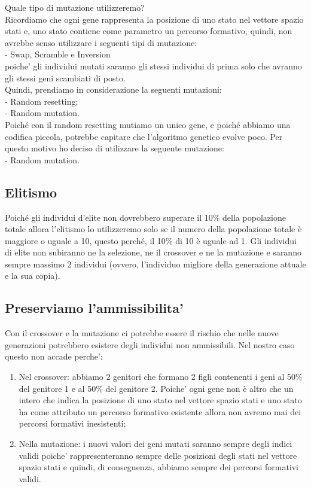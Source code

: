 \documentclass[10pt,a4paper]{article}
\begin{document}
    Quale tipo di mutazione utilizzeremo?\\
    Ricordiamo che ogni gene rappresenta la posizione di uno stato nel vettore spazio stati e, uno stato contiene come parametro 
    un percorso formativo, quindi, non avrebbe senso utilizzare i seguenti tipi di mutazione:\\
    - Swap, Scramble e Inversion\\
    poiche' gli individui mutati saranno gli stessi individui di prima solo che avranno gli stessi geni scambiati di posto.\\
    Quindi, prendiamo in considerazione la seguenti mutazioni:\\
    - Random resetting;\\
    - Random mutation.\\
    Poiché con il random resetting mutiamo un unico gene, e poiché abbiamo una codifica piccola, potrebbe capitare che l'algoritmo genetico evolve poco.
    Per questo motivo ho deciso di utilizzare la seguente mutazione:\\
     - Random mutation.\\
    
    \subsection{Elitismo}
    \label{elitismoSubsection}
    Poiché gli individui d'elite non dovrebbero superare il 10\% della popolazione totale allora l'elitismo lo utilizzeremo solo se il numero della 
    popolazione totale è maggiore o uguale a 10, questo perché, il 10\% di 10 è uguale ad 1.
    Gli individui di elite non subiranno ne la selezione, ne il crossover e ne la mutazione e saranno sempre massimo 2 individui 
    (ovvero, l'individuo migliore della generazione attuale e la sua copia).
    
    \subsection{Preserviamo l'ammissibilita'}
    \label{PreserviamoAmmissibilitaSubsection}
    Con il crossover e la mutazione ci potrebbe essere il rischio che nelle nuove generazioni potrebbero esistere degli individui non ammissibili. 
    Nel nostro caso questo non accade perche':
    \begin{enumerate}
      \item Nel crossover: abbiamo 2 genitori che formano 2 figli contenenti i geni al 50\% del genitore 1 e al 50\% del genitore 2. 
      Poiche' ogni gene non è altro che un intero che indica la posizione di uno stato nel vettore spazio stati e uno stato ha come attributo un 
      percorso formativo esistente allora non avremo mai dei percorsi formativi inesistenti;
      \item Nella mutazione: i nuovi valori dei geni mutati saranno sempre degli indici validi poiche' rappresenteranno sempre delle posizioni degli stati nel 
      vettore spazio stati e quindi, di conseguenza, abbiamo sempre dei percorsi formativi validi.
    \end{enumerate}
    
\end{document}
